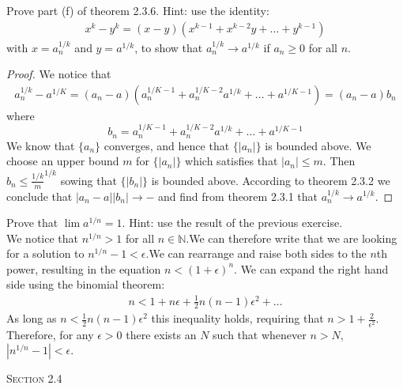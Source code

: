 \documentclass[12pt]{article}
\newcommand{\N}{\mathbb{N}}
\newenvironment{exercise}[2][Exercise]{\begin{trivlist}
\item[\hskip \labelsep {\bfseries #1}\hskip \labelsep {\bfseries #2.}]}{\end{trivlist}}
\begin{document}
\begin{exercise}{2.3.10}
Prove part (f) of theorem 2.3.6. Hint: use the identity:
	\begin{align*}
	x^k - y^k = (x-y)(x^{k-1} + x^{k-2} y+ \hdots  + y^{k-1})
	\end{align*}
with $x= a_n^{1/k}$ and $y= a^{1/k}$, to show that $a_n^{1/k} \to a^{1/k}$ if $a_n \geq 0$ for all $n$. 

	\begin{proof}
		We notice that 
		\begin{align*}
			a_n^{1/k} - a^{1/K} = (a_n - a) (a_n^{1/K-1} + a_n^{1/K -2}a^{1/k} + \hdots + a^{1/K-1}) = (a_n - a) b_n
		\end{align*}
		where
		\[ b_n = a_n^{1/K-1} + a_n^{1/K -2}a^{1/k} + \hdots + a^{1/K-1} \]
		We know that $\{a_n\}$ converges, and hence that $\{|a_n|\}$ is bounded above. We choose an upper bound $m$ for $\{|a_n|\}$ which satisfies that $|a_n| \leq m$. Then $b_n \leq \frac{1/k} m^{1/k}$ sowing that $\{|b_n|\}$ is bounded above. According to theorem 2.3.2 we conclude that $|a_n - a| |b_n| \to -$ and find from theorem 2.3.1 that $a_n^{1/k} \to a^{1/k}$.
	\end{proof}
\end{exercise}


\begin{exercise}{2.3.12}
Prove that $\lim a^{1/n} = 1$. Hint: use the result of the previous exercise.\\

We notice that $n^{1/n} > 1$ for all $n \in \N$.We can therefore write that we are looking for a solution to $n^{1/n} - 1 < \epsilon$.We can rearrange and raise both sides to the $n$th power, resulting in the equation $n < (1 + \epsilon)^n$. We can expand the right hand side using the binomial theorem:
	\begin{align*}
	n < 1+ n \epsilon + \frac{1}{2}n(n-1) \epsilon^2 + \hdots
	\end{align*}
As long as $n < \frac{1}{2} n(n-1) \epsilon^2$ this inequality holds, requiring that $n> 1+ \frac{2}{\epsilon^2}$. Therefore, for any $\epsilon >0$ there exists an $N$ such that whenever $n>N$,  $| n^{1/n} -1|< \epsilon$.
\end{exercise}


\begin{center}
\textsc{\Large Section 2.4}
\end{center}
\end{document}
